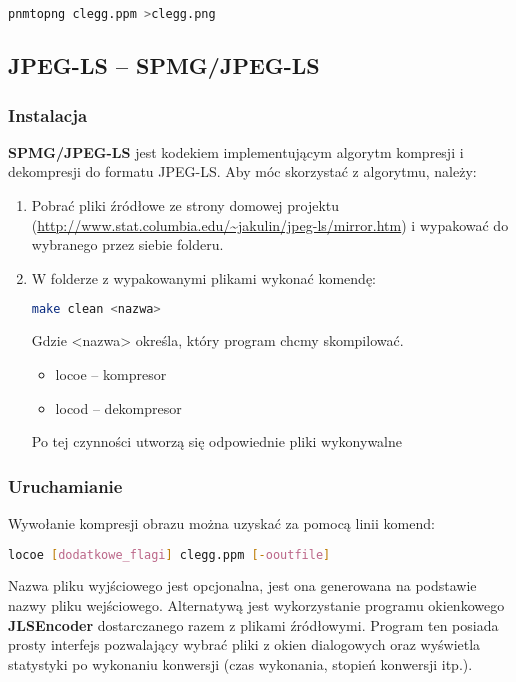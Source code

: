 \begin{lstlisting}[language=bash]
	pnmtopng clegg.ppm >clegg.png
\end{lstlisting}

\subsection{JPEG-LS -- SPMG/JPEG-LS}

\subsubsection{Instalacja}

\textbf{SPMG/JPEG-LS} jest kodekiem implementującym algorytm kompresji i dekompresji do formatu JPEG-LS. Aby móc skorzystać z algorytmu, należy:

\begin{enumerate}
	\item Pobrać pliki źródłowe ze strony domowej projektu (\url{http://www.stat.columbia.edu/~jakulin/jpeg-ls/mirror.htm}) i wypakować do wybranego przez siebie folderu.
	\item W folderze z wypakowanymi plikami wykonać komendę:
	
	\begin{lstlisting}[language=bash]
	make clean <nazwa>
	\end{lstlisting}
	
	Gdzie <nazwa> określa, który program chcmy skompilować.
	
	\begin{itemize}
		\item locoe -- kompresor
		\item locod -- dekompresor
	\end{itemize}
	
	Po tej czynności utworzą się odpowiednie pliki wykonywalne
	
\end{enumerate}

\subsubsection{Uruchamianie}

Wywołanie kompresji obrazu można uzyskać za pomocą linii komend:

\begin{lstlisting}[language=bash]
	locoe [dodatkowe_flagi] clegg.ppm [-ooutfile]
\end{lstlisting}

Nazwa pliku wyjściowego jest opcjonalna, jest ona generowana na podstawie nazwy pliku wejściowego. Alternatywą jest wykorzystanie programu okienkowego \textbf{JLSEncoder} dostarczanego razem z plikami źródłowymi. Program ten posiada prosty interfejs pozwalający wybrać pliki z okien dialogowych oraz wyświetla statystyki po wykonaniu konwersji (czas wykonania, stopień konwersji itp.).

